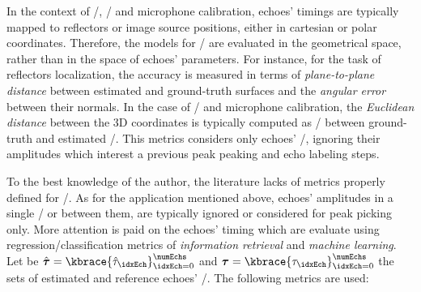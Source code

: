 \mynewline
In the context of \RooGE/, \SSL/ and microphone calibration, echoes' timings are typically mapped to reflectors or image source positions, either in cartesian or polar coordinates.
Therefore, the models for \AER/ are evaluated in the geometrical space, rather than in the space of echoes' parameters.
For instance, for the task of reflectors localization, the accuracy is measured in terms of \textit{plane-to-plane distance} between estimated and ground-truth surfaces and the \textit{angular error} between their normals.
In the case of \SSL/ and microphone calibration, the \textit{Euclidean distance} between the 3D coordinates is typically computed as \RMSEtxt/ between ground-truth and estimated \DOAs/.
This metrics considers only echoes' \TOA/, ignoring their amplitudes which interest a previous peak peaking and echo labeling steps.

\mynewline
To the best knowledge of the author, the literature lacks of metrics properly defined for \AER/.
As for the application mentioned above, echoes' amplitudes in a single \RIR/ or between them, are typically ignored or considered for peak picking only.
More attention is paid on the echoes' timing which are evaluate using regression/classification metrics of \textit{information retrieval} and \textit{machine learning}.
\\Let be $\hat{\boldsymbol{\tau}} = \kbrace{\hat{\tau}_\idxEch}_{\idxEch=0}^{\numEchs}$ and $\boldsymbol{\tau} = \kbrace{\tau_\idxEch}_{\idxEch=0}^{\numEchs}$ the sets of estimated and reference echoes' \TOAs/.
The following metrics are used:

